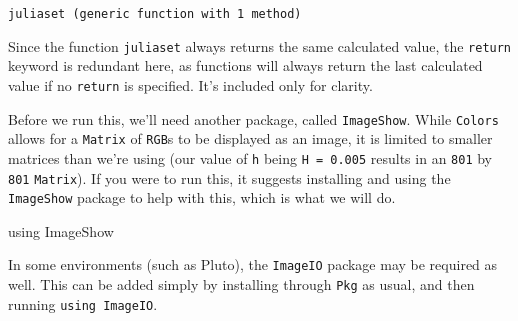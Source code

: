 \documentclass[
  letterpaper,
  DIV=11,
  numbers=noendperiod]{scrreprt}
\newenvironment{Shaded}{\begin{snugshade}}{\end{snugshade}}
\newcommand{\BuiltInTok}[1]{\textcolor[rgb]{0.00,0.23,0.31}{#1}}
\newcommand{\ImportTok}[1]{\textcolor[rgb]{0.00,0.46,0.62}{#1}}
\begin{document}
\begin{verbatim}
juliaset (generic function with 1 method)
\end{verbatim}

\begin{tcolorbox}[enhanced jigsaw, toprule=.15mm, opacitybacktitle=0.6, leftrule=.75mm, breakable, coltitle=black, bottomrule=.15mm, colbacktitle=quarto-callout-note-color!10!white, bottomtitle=1mm, rightrule=.15mm, title=\textcolor{quarto-callout-note-color}{\faInfo}\hspace{0.5em}{Note}, colframe=quarto-callout-note-color-frame, left=2mm, colback=white, opacityback=0, arc=.35mm, toptitle=1mm, titlerule=0mm]

Since the function \texttt{juliaset} always returns the same calculated
value, the \texttt{return} keyword is redundant here, as functions will
always return the last calculated value if no \texttt{return} is
specified. It's included only for clarity.

\end{tcolorbox}

Before we run this, we'll need another package, called
\texttt{ImageShow}. While \texttt{Colors} allows for a \texttt{Matrix}
of \texttt{RGB}s to be displayed as an image, it is limited to smaller
matrices than we're using (our value of \texttt{h} being
\texttt{H\ =\ 0.005} results in an \texttt{801} by \texttt{801}
\texttt{Matrix}). If you were to run this, it suggests installing and
using the \texttt{ImageShow} package to help with this, which is what we
will do.

\begin{Shaded}
\begin{Highlighting}[]
\ImportTok{using} \BuiltInTok{ImageShow}
\end{Highlighting}
\end{Shaded}

\begin{tcolorbox}[enhanced jigsaw, toprule=.15mm, opacitybacktitle=0.6, leftrule=.75mm, breakable, coltitle=black, bottomrule=.15mm, colbacktitle=quarto-callout-warning-color!10!white, bottomtitle=1mm, rightrule=.15mm, title=\textcolor{quarto-callout-warning-color}{\faExclamationTriangle}\hspace{0.5em}{Warning}, colframe=quarto-callout-warning-color-frame, left=2mm, colback=white, opacityback=0, arc=.35mm, toptitle=1mm, titlerule=0mm]

In some environments (such as Pluto), the \texttt{ImageIO} package may
be required as well. This can be added simply by installing through
\texttt{Pkg} as usual, and then running \texttt{using\ ImageIO}.

\end{tcolorbox}
\end{document}
